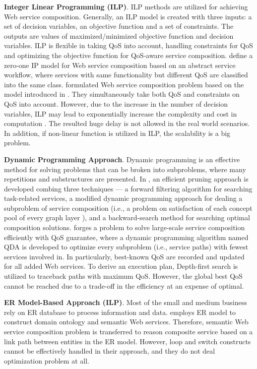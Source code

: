 \textbf{Integer Linear Programming (ILP)}. ILP methods are utilized for achieving Web service composition. Generally, an ILP model is created with three inputs: a set of decision variables, an objective function and a set of constraints. The outputs are values of maximized/minimized objective function and decision variables. ILP is flexible in taking QoS into account, handling constraints for QoS and optimizing the objective function for QoS-aware service composition. \cite{gao2005Web} define a zero-one IP model for Web service composition based on an abstract service workflow, where services with same functionality but different QoS are classified into the same class.  \cite{yoo2008Web} formulated Web service composition problem based on the model introduced in \cite{gao2005Web}. They simultaneously take both QoS and constraints on QoS into account. However, due to the increase in the number of decision variables, ILP may lead to exponentially increase the complexity and cost in computation \cite{li2016full}. The resulted huge delay is not allowed in the real world scenarios. In addition, if non-linear function is utilized in ILP, the scalability is a big problem.
 
\textbf{Dynamic Programming Approach}. Dynamic programming is an effective method for solving problems that can be broken into subproblems, where many repetitions and substructures are presented. In  \cite{huang2009effective}, an efficient pruning approach is developed combing three techniques --- a forward filtering algorithm for searching task-related services, a modified dynamic programming approach for dealing a subproblem of service composition (i.e., a problem on satisfaction of each concept pool of every graph layer ), and a backward-search method for searching optimal composition solutions. \cite{xu2012towards} forges a problem to solve large-scale service composition efficiently with QoS guarantee, where a dynamic programming algorithm named QDA is developed to optimize every subproblem (i.e., service paths) with fewest services involved in. In particularly, best-known QoS are recorded and updated for all added Web services. To derive an execution plan, Depth-first search is utilized to traceback paths with maximum QoS. However, the global best QoS cannot be reached due to a trade-off in the efficiency at an expense of optimal.

\textbf{ER Model-Based Approach (ILP)}. Most of the small and medium business rely on ER database to process information and data. \cite{xu2010semantic} employs ER model to construct domain ontology and semantic Web services. Therefore, semantic Web service composition problem is transferred to reason composite service based on a link path between entities in the ER model. However, loop and switch constructs cannot be effectively handled in their approach, and they do not deal optimization problem at all.

